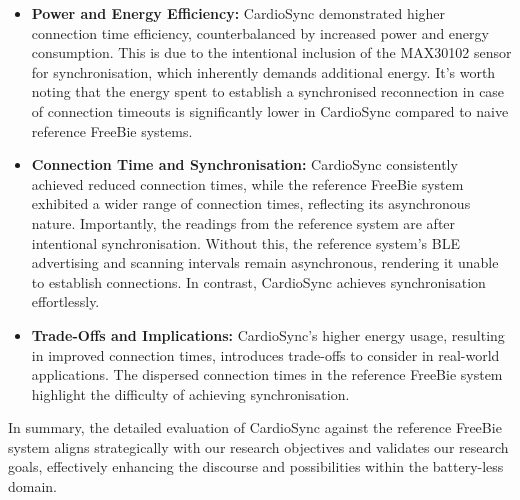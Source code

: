\begin{itemize}
    \item \textbf{Power and Energy Efficiency:} CardioSync demonstrated higher connection time efficiency, counterbalanced by increased power and energy consumption. This is due to the intentional inclusion of the MAX30102 sensor for synchronisation, which inherently demands additional energy. It's worth noting that the energy spent to establish a synchronised reconnection in case of connection timeouts is significantly lower in CardioSync compared to naive reference FreeBie systems.

    \item \textbf{Connection Time and Synchronisation:} CardioSync consistently achieved reduced connection times, while the reference FreeBie system exhibited a wider range of connection times, reflecting its asynchronous nature. Importantly, the readings from the reference system are after intentional synchronisation. Without this, the reference system's BLE advertising and scanning intervals remain asynchronous, rendering it unable to establish connections. In contrast, CardioSync achieves synchronisation effortlessly.

    \item \textbf{Trade-Offs and Implications:} CardioSync's higher energy usage, resulting in improved connection times, introduces trade-offs to consider in real-world applications. The dispersed connection times in the reference FreeBie system highlight the difficulty of achieving synchronisation.

\end{itemize}

\noindent In summary, the detailed evaluation of CardioSync against the reference FreeBie system aligns strategically with our research objectives and validates our research goals, effectively enhancing the discourse and possibilities within the battery-less domain.
